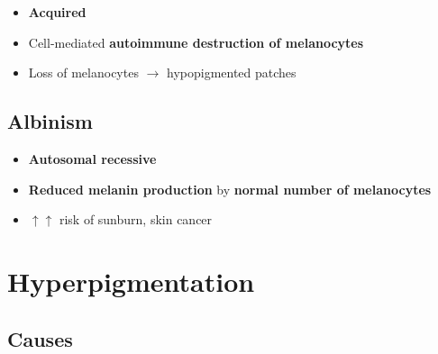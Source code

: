 \documentclass[
  12pt,
]{memoir}
\providecommand{\tightlist}{%
  \setlength{\itemsep}{0pt}\setlength{\parskip}{0pt}}
\begin{document}
\begin{itemize}
\tightlist
\item
  \textbf{Acquired}
\item
  Cell-mediated \textbf{autoimmune destruction of melanocytes}
\item
  Loss of melanocytes \(\rightarrow\) hypopigmented patches
\end{itemize}

\hypertarget{albinism}{%
\subsection{Albinism}\label{albinism}}

\begin{itemize}
\tightlist
\item
  \textbf{Autosomal recessive}
\item
  \textbf{Reduced melanin production} by \textbf{normal number of
  melanocytes}
\item
  \(\uparrow\uparrow\) risk of sunburn, skin cancer
\end{itemize}

\hypertarget{hyperpigmentation}{%
\section{Hyperpigmentation}\label{hyperpigmentation}}

\hypertarget{causes-2}{%
\subsection{Causes}\label{causes-2}}
\end{document}

